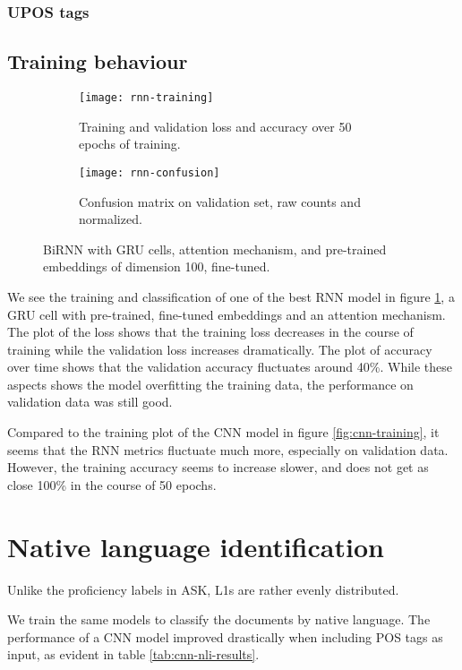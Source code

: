 \subsubsection*{UPOS tags}


\subsection{Training behaviour}

\begin{figure}
  \begin{subfigure}{\linewidth}
    \centering
    \texttt{[image: rnn-training]}
    \caption{Training and validation loss and accuracy over 50 epochs of training.}
  \end{subfigure}
  \begin{subfigure}{\linewidth}
    \centering
    \texttt{[image: rnn-confusion]}
    \caption{Confusion matrix on validation set, raw counts and normalized.}
  \end{subfigure}
  \caption{BiRNN with GRU cells, attention mechanism, and pre-trained
           embeddings of dimension 100, fine-tuned.}
  \label{fig:rnn-training}
\end{figure}

We see the training and classification of one of the best RNN model in figure
\ref{fig:rnn-training}, a GRU cell with pre-trained, fine-tuned embeddings
and an attention mechanism. The plot of the loss shows that the training loss
decreases in the course of training while the validation loss increases
dramatically. The plot of accuracy over time shows that the validation
accuracy fluctuates around 40\%. While these aspects shows the model
overfitting the training data, the performance on validation data was still
good.

Compared to the training plot of the CNN model in figure
\ref{fig:cnn-training}, it seems that the RNN metrics fluctuate much more,
especially on validation data. However, the training accuracy seems to
increase slower, and does not get as close 100\% in the course of 50 epochs.


\section{Native language identification}

Unlike the proficiency labels in ASK, \ac{L1}s are rather evenly distributed.

We train the same models to classify the documents by native language. The
performance of a \ac{CNN} model improved drastically when including \ac{POS}
tags as input, as evident in table \ref{tab:cnn-nli-results}.

